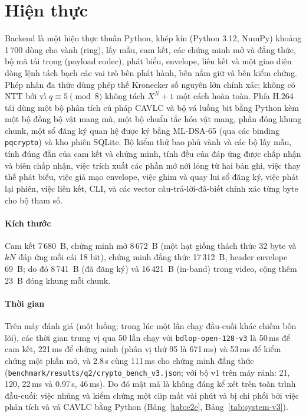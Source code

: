 \documentclass[journal]{IEEEtran}
\begin{document}
\section{Hiện thực}
\label{sec:implementation}

Backend là một hiện thực thuần Python, khép kín (Python 3.12, NumPy) khoảng
1\,700 dòng cho vành (ring), lấy mẫu, cam kết, các chứng minh mở và đẳng thức,
bộ mã tải trọng (payload codec), phát biểu, envelope, liên kết và một giao diện
dòng lệnh tách bạch các vai trò bên phát hành, bên nắm giữ và bên kiểm chứng.
Phép nhân đa thức dùng phép thế Kronecker số nguyên lớn chính xác; không có NTT
bởi vì $q\equiv5\pmod8$ không tách $X^N+1$ một cách hoàn toàn. Phía H.264 tái
dùng một bộ phân tích cú pháp CAVLC và bộ vá luồng bit bằng Python kèm một bộ
đồng bộ vật mang mù, một bộ chuẩn tắc hóa vật mang, phần đóng khung chunk, một
sổ đăng ký quan hệ được ký bằng ML-DSA-65 (qua các binding \texttt{pqcrypto})
và kho phiên SQLite. Bộ kiểm thử bao phủ vành và các bộ lấy mẫu, tính đúng đắn
của cam kết và chứng minh, tính đều của đáp ứng được chấp nhận và biên chấp
nhận, việc trích xuất các phần mở nới lỏng từ hai bản ghi, việc thay thế phát
biểu, việc giả mạo envelope, việc ghim và quay lui sổ đăng ký, việc phát lại
phiên, việc liên kết, CLI, và các vector câu-trả-lời-đã-biết chính xác từng
byte cho bộ tham số.

\paragraph{Kích thước} Cam kết 7\,680~B, chứng minh mở 8\,672~B (một hạt giống
thách thức 32 byte và $kN$ đáp ứng mỗi cái 18 bit), chứng minh đẳng thức
17\,312~B, header envelope 69~B; do đó 8\,741~B (đã đăng ký) và 16\,421~B
(in-band) trong video, cộng thêm 23~B đóng khung mỗi chunk.

\paragraph{Thời gian} Trên máy đánh giá (một luồng; trong lúc một lần chạy
đầu-cuối khác chiếm bốn lõi), các thời gian trung vị qua 50 lần chạy với
\texttt{bdlop-open-128-v3} là 50\,ms để cam kết, 221\,ms để chứng minh (phân vị
thứ 95 là 671\,ms) và 53\,ms để kiểm chứng một phần mở, và 2.8\,s cùng
111\,ms cho chứng minh đẳng thức
(\texttt{benchmark/results/q2/crypto\_bench\_v3.json}; với bộ v1 trên máy rảnh:
21, 120, 22\,ms và 0.97\,s, 46\,ms). Do đó mật mã là không đáng kể xét trên
toàn trình đầu-cuối: việc nhúng và kiểm chứng một clip mất vài phút và bị chi
phối bởi việc phân tích và vá CAVLC bằng Python (Bảng~\ref{tab:e2e},
Bảng~\ref{tab:system-v3}).
\end{document}
